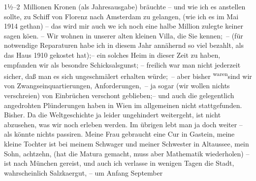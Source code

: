\begin{ledgroupsized}[t]{13cm}
               1½–2 Millionen Kronen \introOben{}(als Jahresausgabe)\introOben{} bräuchte – und wie
               ich es anstellen sollte, zu Schiff von Florenz
               nach Amsterdam zu gelangen, (wie ich es im
                  Mai 1914 gethan) – das wird mir \introOben{}auch we{\geminationn} ich noch eine halbe Million zulegte\introOben{} keiner
               sagen kö{\geminationn}en. – Wir wohnen  in unserer alten kleinen Villa, die Sie kennen; – (für notwendige
               Reparaturen habe ich in diesem Jahr annähernd so viel bezahlt, als das Haus
                  1910 gekostet hat);– ein solches Heim in dieser Zeit \introOben{}zu\introOben{} haben, empfanden wir als besondre Schicksalsgunst; –
               freilich  war man nicht jederzeit sicher, daß
               man es sich unge{\pb}schmälert erhalten würde; – aber
               bisher \substVorne{}\textsuperscript{waren}\substDazwischen{}sind\substHinten{} wir von Zwangseinquartierungen, Anforderungen, – ja sogar (wir wollen nichts
               verschreien) von Einbrüchen verschont geblieben;– und auch die gelegentlich
               angedrohten Plünderungen haben in Wien im
               allgemeinen nicht stattgefunden. Bisher. Da die Weltgeschichte ja leider ungehindert
               weitergeht, ist nicht abzusehen, was wir noch erleben werden. Im übrigen lebt man ja
               doch weiter – als könnte nichts passiren. Meine Frau gebraucht eine Cur in Gastein, meine kleine Tochter ist bei meinem Schwager und meiner Schwester in Altaussee, mein Sohn, achtzehn, (hat die
               Matura gemacht, muss aber Mathematik wiederholen) – ist nach München gereist, und auch ich verlasse in wenigen Tagen die
               Stadt, wahrschein{\pb}lich Salzka{\geminationm}ergut, – um Anfang September

\end{ledgroupsized}
